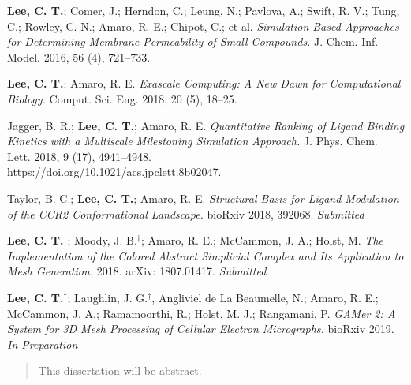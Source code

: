 \begin{frontmatter}
\begin{vitapage}
\begin{publications}
  \item \textbf{Lee, C. T.}; Comer, J.; Herndon, C.; Leung, N.; Pavlova, A.; Swift, R. V.; Tung, C.; Rowley, C. N.; Amaro, R. E.; Chipot, C.; et al. \emph{Simulation-Based Approaches for Determining Membrane Permeability of Small Compounds.} J. Chem. Inf. Model. 2016, 56 (4), 721–733.
  \item \textbf{Lee, C. T.}; Amaro, R. E. \emph{Exascale Computing: A New Dawn for Computational Biology.} Comput. Sci. Eng. 2018, 20 (5), 18–25.
  \item Jagger, B. R.; \textbf{Lee, C. T.}; Amaro, R. E. \emph{Quantitative Ranking of Ligand Binding Kinetics with a Multiscale Milestoning Simulation Approach.} J. Phys. Chem. Lett. 2018, 9 (17), 4941–4948.\\ https://doi.org/10.1021/acs.jpclett.8b02047.
  \item Taylor, B. C.; \textbf{Lee, C. T.}; Amaro, R. E. \emph{Structural Basis for Ligand Modulation of the CCR2 Conformational Landscape.} bioRxiv 2018, 392068. \textit{Submitted}
  \item \textbf{Lee, C. T.$^{\dagger}$}; Moody, J. B.$^{\dagger}$; Amaro, R. E.; McCammon, J. A.; Holst, M. \emph{The Implementation of the Colored Abstract Simplicial Complex and Its Application to Mesh Generation.} 2018. arXiv: 1807.01417. \textit{Submitted}
  \item \textbf{Lee, C. T.$^{\dagger}$}; Laughlin, J. G.$^{\dagger}$, Angliviel de La Beaumelle, N.; Amaro, R. E.; McCammon, J. A.; Ramamoorthi, R.; Holst, M. J.; Rangamani, P. \emph{GAMer 2: A System for 3D Mesh Processing of Cellular Electron Micrographs.} bioRxiv 2019. \textit{In Preparation}
\end{publications}
\end{vitapage}

%
%
\begin{abstract}
  This dissertation will be abstract.
\end{abstract}
\end{frontmatter}
